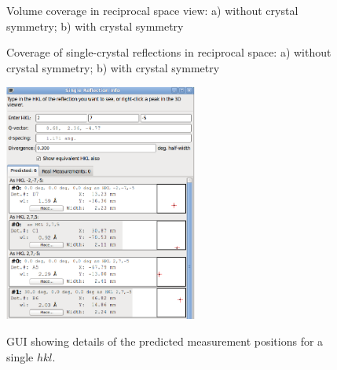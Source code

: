 \documentclass[draft]{iucr}              %
\begin{document}
\begin{figure}
\caption{Volume coverage in reciprocal space view: a) without crystal symmetry;
b) with crystal symmetry}
\label{fig:volume_view}
\end{figure}


\begin{figure}
\caption{Coverage of single-crystal reflections in reciprocal space: a) without
crystal symmetry; b) with crystal symmetry}
\label{fig:refl_view}
\end{figure}

\begin{figure}
\caption{GUI showing details of the predicted measurement positions for a
single $hkl$.}
\includegraphics[width=2.5in]{single_reflection_2.eps}
\label{fig:single_reflection}
\end{figure}
\end{document}

